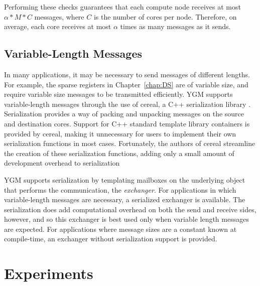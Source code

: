 \documentclass[10]{report}
\begin{document}
Performing these checks guarantees that each compute node receives at most $\alpha * M * C$ messages, where $C$ is the number of cores per node. 
Therefore, on average, each core receives at most $\alpha$ times as many messages as it sends.

\subsection{Variable-Length Messages} 
\label{async:sec:serialization}

In many applications, it may be necessary to send messages of different lengths. 
For example, the sparse registers in Chapter~\ref{chap:DS} are of variable size, and require variable size messages to be transmitted efficiently. 
YGM supports variable-length messages through the use of cereal, a C++ serialization library \cite{cereal}. 
Serialization provides a way of packing and unpacking messages on the source and destination cores. 
Support for C++ standard template library containers is provided by cereal, making it unnecessary for users to implement their own serialization functions in most cases.
Fortunately, the authors of cereal streamline the creation of these serialization functions, adding only a small amount of development overhead to serialization

YGM supports serialization by templating mailboxes on the underlying object that performs the communication, the
\emph{exchanger}. 
For applications in which variable-length messages are necessary, a serialized exchanger is available.
The serialization does add computational overhead on both the send and receive sides, however, and so this exchanger is best used only when variable length messages are expected.
For applications where message sizes are a constant known at compile-time, an exchanger without serialization support is provided. 

\section{Experiments} \label{async:sec:experiments}
\end{document}
